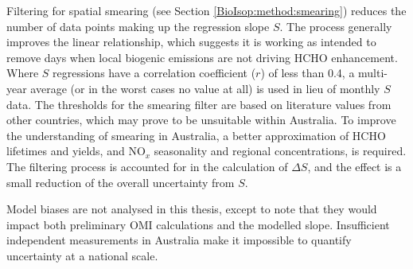     
    Filtering for spatial smearing (see Section \ref{BioIsop:method:smearing}) reduces the number of data points making up the regression slope $S$. 
    The process generally improves the linear relationship, which suggests it is working as intended to remove days when local biogenic emissions are not driving HCHO enhancement.
    Where $S$ regressions have a correlation coefficient ($r$) of less than 0.4, a multi-year average (or in the worst cases no value at all) is used in lieu of monthly $S$ data.
    The thresholds for the smearing filter are based on literature values from other countries, which may prove to be unsuitable within Australia.
    To improve the understanding of smearing in Australia, a better approximation of HCHO lifetimes and yields, and NO$_x$ seasonality and regional concentrations, is required.
    The filtering process is accounted for in the calculation of $\Delta S$, and the effect is a small reduction of the overall uncertainty from $S$.
    
    
    
      Model biases are not analysed in this thesis, except to note that they would impact both preliminary OMI calculations and the modelled slope. 
      Insufficient independent measurements in Australia make it impossible to quantify uncertainty %
      at a national scale.
      
